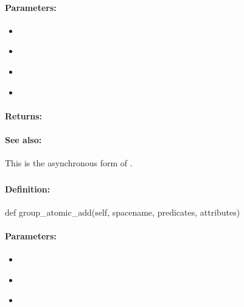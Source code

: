 \paragraph{Parameters:}
\begin{itemize}[noitemsep]
\item {}\\

\item {}\\

\item {}\\

\item {}\\

\end{itemize}

\paragraph{Returns:}


\paragraph{See also:}  This is the asynchronous form of .

\pagebreak
\subsubsection{}
\label{api:python:group_atomic_add}


\paragraph{Definition:}
\begin{pythoncode}
def group_atomic_add(self, spacename, predicates, attributes)
\end{pythoncode}

\paragraph{Parameters:}
\begin{itemize}[noitemsep]
\item {}\\

\item {}\\

\item {}\\

\end{itemize}

